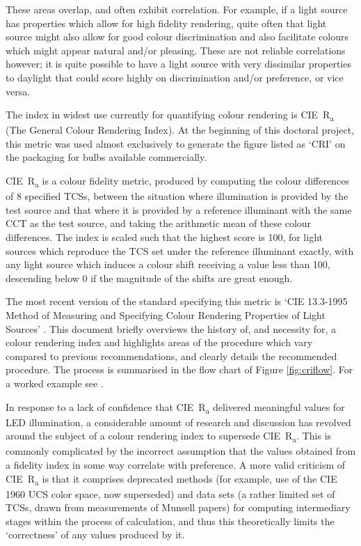 These areas overlap, and often exhibit correlation. For example, if a light source has properties which allow for high fidelity rendering, quite often that light source might also allow for good colour discrimination and also facilitate colours which might appear natural and/or pleasing. These are not reliable correlations however; it is quite possible to have a light source with very dissimilar properties to daylight that could score highly on discrimination and/or preference, or vice versa.

The index in widest use currently for quantifying colour rendering is \gls{CIE}~R\textsubscript{a} (The General Colour Rendering Index). At the beginning of this doctoral project, this metric was used almost exclusively to generate the figure listed as `CRI' on the packaging for bulbs available commercially. %

\gls{CIE}~R\textsubscript{a} is a colour fidelity metric, produced by computing the colour differences of 8 specified \glspl{TCS}, between the situation where illumination is provided by the test source and that where it is provided by a reference illuminant with the same \gls{CCT} as the test source, and taking the arithmetic mean of these colour differences. The index is scaled such that the highest score is 100, for light sources which reproduce the \gls{TCS} set under the reference illuminant exactly, with any light source which induces a colour shift receiving a value less than 100, descending below 0 if the magnitude of the shifts are great enough.

The most recent version of the standard specifying this metric is `\gls{CIE} 13.3-1995 Method of Measuring and Specifying Colour Rendering Properties of Light Sources' \citep{cie_cie_1995}. This document briefly overviews the history of, and necessity for, a colour rendering index and highlights areas of the procedure which vary compared to previous recommendations, and clearly details the recommended procedure. The process is summarised in the flow chart of Figure \ref{fig:criflow}. For a worked example see \citet[p.388]{hunt_measuring_2011}.

In response to a lack of confidence that \gls{CIE}~R\textsubscript{a} delivered meaningful values for \gls{LED} illumination, a considerable amount of research and discussion has revolved around the subject of a colour rendering index to supersede \gls{CIE}~R\textsubscript{a}. This is commonly complicated by the incorrect assumption that the values obtained from a fidelity index in some way correlate with preference. A more valid criticism of \gls{CIE}~R\textsubscript{a} is that it comprises deprecated methods (for example, use of the \gls{CIE} 1960 UCS color space, now superseded) and data sets (a rather limited set of \glspl{TCS}, drawn from measurements of Munsell papers) for computing intermediary stages within the process of calculation, and thus this theoretically limits the `correctness' of any values produced by it.

